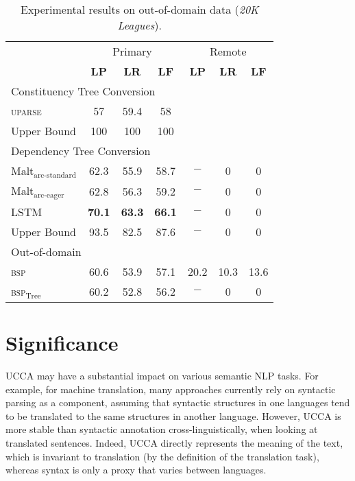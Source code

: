 \documentclass[11pt]{article}
\begin{document}
\begin{table}[ht!]
  \centering
\begin{tabular}{l|ccc|ccc}
& \multicolumn{3}{c|}{Primary} & \multicolumn{3}{c}{Remote} \\
& \textbf{LP} & \textbf{LR} & \textbf{LF} & \textbf{LP} & \textbf{LR} & \textbf{LF} \\
\hline
\multicolumn{4}{l}{\rule{0pt}{2ex} \footnotesize Constituency Tree Conversion} \\
\textsc{uparse} & 57 & 59.4 & 58 \\
Upper Bound & 100 & 100 & 100 \\
\hline
\multicolumn{4}{l}{\rule{0pt}{4ex} \footnotesize Dependency Tree Conversion} \\
Malt$_{\textrm{arc-standard}}$ & 62.3 & 55.9 & 58.7 & $-$ & 0 & 0 \\
Malt$_{\textrm{arc-eager}}$ & 62.8 & 56.3 & 59.2 & $-$ & 0 & 0 \\
LSTM & {\bf 70.1} & {\bf 63.3} & {\bf 66.1} & $-$ & 0 & 0 \\
Upper Bound & 93.5 & 82.5 & 87.6 & $-$ & 0 & 0 \\
\hline
\multicolumn{4}{l}{\rule{0pt}{4ex} \footnotesize Out-of-domain} \\
\textsc{bsp} & 60.6 & 53.9 & 57.1 & 20.2 & 10.3 & 13.6 \\
\textsc{bsp}$_{\mathrm{Tree}}$ & 60.2 & 52.8 & 56.2 & $-$ & 0 & 0 \\
\end{tabular}
\caption{
  Experimental results on out-of-domain data (\textit{20K Leagues}).
}
\label{table:results_ood}
\end{table}


\section{Significance}\label{sec:significance}

UCCA may have a substantial impact on various semantic NLP tasks. For example,
for machine translation, many approaches currently rely on syntactic parsing as
a component, assuming that syntactic structures in one languages tend to be
translated to the same structures in another language. However, UCCA is more
stable than syntactic annotation cross-linguistically, when looking at
translated sentences\cite{sulem2014thesis}. Indeed, UCCA directly represents
the meaning of the text, which is invariant to translation (by the definition
of the translation task), whereas syntax is only a proxy that varies between
languages.
\end{document}
